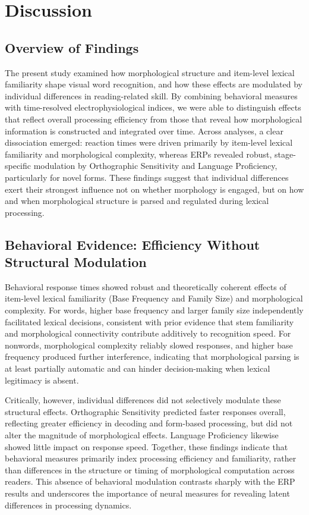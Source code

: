 \documentclass[utf8]{FrontiersinHarvard} %
\begin{document}
\section{Discussion}

\subsection{Overview of Findings}
The present study examined how morphological structure and item-level lexical familiarity shape visual word recognition, and how these effects are modulated by individual differences in reading-related skill. By combining behavioral measures with time-resolved electrophysiological indices, we were able to distinguish effects that reflect overall processing efficiency from those that reveal how morphological information is constructed and integrated over time. Across analyses, a clear dissociation emerged: reaction times were driven primarily by item-level lexical familiarity and morphological complexity, whereas ERPs revealed robust, stage-specific modulation by Orthographic Sensitivity and Language Proficiency, particularly for novel forms. These findings suggest that individual differences exert their strongest influence not on whether morphology is engaged, but on how and when morphological structure is parsed and regulated during lexical processing.

\subsection{Behavioral Evidence: Efficiency Without Structural Modulation}
Behavioral response times showed robust and theoretically coherent effects of item-level lexical familiarity (Base Frequency and Family Size) and morphological complexity. For words, higher base frequency and larger family size independently facilitated lexical decisions, consistent with prior evidence that stem familiarity and morphological connectivity contribute additively to recognition speed. For nonwords, morphological complexity reliably slowed responses, and higher base frequency produced further interference, indicating that morphological parsing is at least partially automatic and can hinder decision-making when lexical legitimacy is absent.

Critically, however, individual differences did not selectively modulate these structural effects. Orthographic Sensitivity predicted faster responses overall, reflecting greater efficiency in decoding and form-based processing, but did not alter the magnitude of morphological effects. Language Proficiency likewise showed little impact on response speed. Together, these findings indicate that behavioral measures primarily index processing efficiency and familiarity, rather than differences in the structure or timing of morphological computation across readers. This absence of behavioral modulation contrasts sharply with the ERP results and underscores the importance of neural measures for revealing latent differences in processing dynamics.
\end{document}
